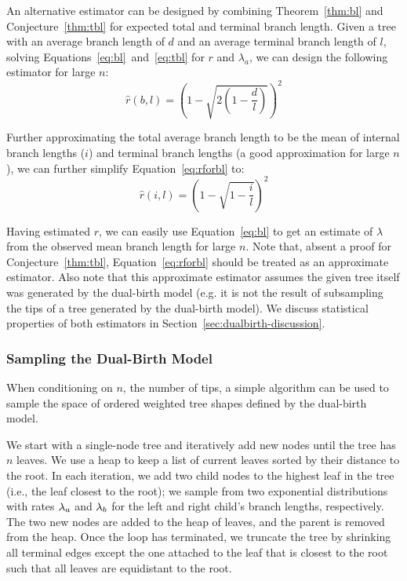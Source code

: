 An alternative estimator can be designed by combining Theorem~\ref{thm:bl} and Conjecture~\ref{thm:tbl} for expected total and terminal branch length. Given a tree with an average branch length of $d$ and an average terminal branch length of $l$, solving Equations~\ref{eq:bl}~and~\ref{eq:tbl} for $r$ and $\lambda_a$, we can design the following estimator for large $n$:
\begin{equation}\label{eq:rforbl}
\hat{r}(b,l) = \left(1-\sqrt{2\left(1-\frac{d}{l}\right)}\right)^2
\end{equation}

Further approximating the total average branch length to be the mean of internal branch lengths ($i$) and terminal branch lengths (a good approximation for large $n$), we can further simplify Equation~\ref{eq:rforbl} to:
\begin{equation}\label{eq:rforbl-approx}
\hat{r}(i,l) = \left(1-\sqrt{1-\frac{i}{l}}\right)^2
\end{equation}

Having estimated $r$, we can easily use Equation~\ref{eq:bl} to get an estimate of $\lambda$ from the observed mean branch length for large $n$. Note that, absent a proof for Conjecture~\ref{thm:tbl}, Equation~\ref{eq:rforbl} should be treated as an approximate estimator. Also note that this approximate estimator assumes the given tree itself was generated by the dual-birth model (e.g. it is not the result of subsampling the tips of a tree generated by the dual-birth model). We discuss statistical properties of both estimators in Section~\ref{sec:dualbirth-discussion}. 

\subsubsection{Sampling the Dual-Birth Model}\label{sec:samplingalgo}\label{sec:db-algo}
When conditioning on $n$, the number of tips, a simple algorithm can be used to sample the space of ordered weighted tree shapes defined by the dual-birth model.

We start with a single-node tree and iteratively add new nodes until the tree has $n$ leaves. We use a heap to keep a list of current leaves sorted by their distance to the root. In each iteration, we add two child nodes to the highest leaf in the tree (i.e., the leaf closest to the root); we sample from two exponential distributions with rates $\lambda_a$ and $\lambda_b$ for the left and right child's branch lengths, respectively. The two new nodes are added to the heap of leaves, and the parent is removed from the heap. Once the loop has terminated, we truncate the tree by shrinking all terminal edges except the one attached to the leaf that is closest to the root such that all leaves are equidistant to the root.

